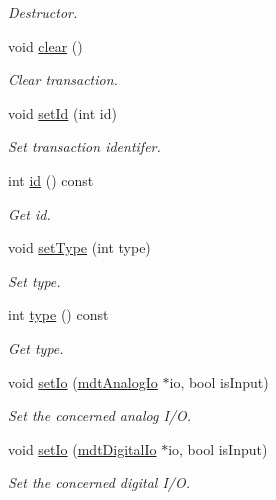 \begin{DoxyCompactItemize}
\begin{DoxyCompactList}\small\item\em Destructor. \end{DoxyCompactList}\item 
void \hyperlink{classmdt_port_transaction_a5f7b04df58291d52e61c5bd1b7f7bb7f}{clear} ()
\begin{DoxyCompactList}\small\item\em Clear transaction. \end{DoxyCompactList}\item 
void \hyperlink{classmdt_port_transaction_a3f0ff197ba4b58f0dd206e6151109fde}{setId} (int id)
\begin{DoxyCompactList}\small\item\em Set transaction identifer. \end{DoxyCompactList}\item 
int \hyperlink{classmdt_port_transaction_ae68abafb0501c98f85147adc176d8d83}{id} () const 
\begin{DoxyCompactList}\small\item\em Get id. \end{DoxyCompactList}\item 
void \hyperlink{classmdt_port_transaction_a4398eb06986d858d3d0a63f6a290f0bf}{setType} (int type)
\begin{DoxyCompactList}\small\item\em Set type. \end{DoxyCompactList}\item 
int \hyperlink{classmdt_port_transaction_aa8acfc909bb1956b16cca02d721357f4}{type} () const 
\begin{DoxyCompactList}\small\item\em Get type. \end{DoxyCompactList}\item 
void \hyperlink{classmdt_port_transaction_a122a98e4e93295c9907ed7cd0bde1f19}{setIo} (\hyperlink{classmdt_analog_io}{mdtAnalogIo} $\ast$io, bool isInput)
\begin{DoxyCompactList}\small\item\em Set the concerned analog I/O. \end{DoxyCompactList}\item 
void \hyperlink{classmdt_port_transaction_a4062fb0e9a1d5fea0ec934bff54cd519}{setIo} (\hyperlink{classmdt_digital_io}{mdtDigitalIo} $\ast$io, bool isInput)
\begin{DoxyCompactList}\small\item\em Set the concerned digital I/O. \end{DoxyCompactList}\item 

\end{DoxyCompactItemize}
